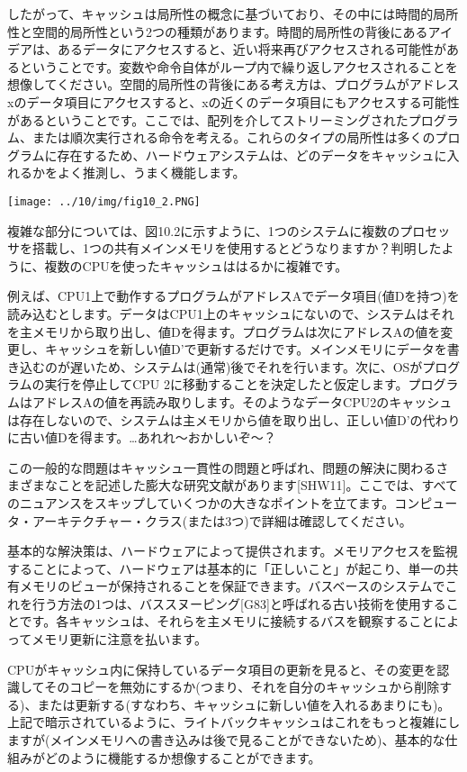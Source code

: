 したがって、キャッシュは局所性の概念に基づいており、その中には時間的局所性と空間的局所性という2つの種類があります。時間的局所性の背後にあるアイデアは、あるデータにアクセスすると、近い将来再びアクセスされる可能性があるということです。変数や命令自体がループ内で繰り返しアクセスされることを想像してください。空間的局所性の背後にある考え方は、プログラムがアドレスxのデータ項目にアクセスすると、xの近くのデータ項目にもアクセスする可能性があるということです。ここでは、配列を介してストリーミングされたプログラム、または順次実行される命令を考える。これらのタイプの局所性は多くのプログラムに存在するため、ハードウェアシステムは、どのデータをキャッシュに入れるかをよく推測し、うまく機能します。

\texttt{[image: ../10/img/fig10\_2.PNG]}

複雑な部分については、図10.2に示すように、1つのシステムに複数のプロセッサを搭載し、1つの共有メインメモリを使用するとどうなりますか？判明したように、複数のCPUを使ったキャッシュははるかに複雑です。

例えば、CPU1上で動作するプログラムがアドレスAでデータ項目(値Dを持つ)を読み込むとします。データはCPU1上のキャッシュにないので、システムはそれを主メモリから取り出し、値Dを得ます。プログラムは次にアドレスAの値を変更し、キャッシュを新しい値D'で更新するだけです。メインメモリにデータを書き込むのが遅いため、システムは(通常)後でそれを行います。次に、OSがプログラムの実行を停止してCPU
2に移動することを決定したと仮定します。プログラムはアドレスAの値を再読み取りします。そのようなデータCPU2のキャッシュは存在しないので、システムは主メモリから値を取り出し、正しい値D'の代わりに古い値Dを得ます。\ldots あれれ～おかしいぞ～？

この一般的な問題はキャッシュ一貫性の問題と呼ばれ、問題の解決に関わるさまざまなことを記述した膨大な研究文献があります{[}SHW11{]}。ここでは、すべてのニュアンスをスキップしていくつかの大きなポイントを立てます。コンピュータ・アーキテクチャー・クラス(または3つ)で詳細は確認してください。

基本的な解決策は、ハードウェアによって提供されます。メモリアクセスを監視することによって、ハードウェアは基本的に「正しいこと」が起こり、単一の共有メモリのビューが保持されることを保証できます。バスベースのシステムでこれを行う方法の1つは、バススヌーピング{[}G83{]}と呼ばれる古い技術を使用することです。各キャッシュは、それらを主メモリに接続するバスを観察することによってメモリ更新に注意を払います。

CPUがキャッシュ内に保持しているデータ項目の更新を見ると、その変更を認識してそのコピーを無効にするか(つまり、それを自分のキャッシュから削除する)、または更新する(すなわち、キャッシュに新しい値を入れるあまりにも)。上記で暗示されているように、ライトバックキャッシュはこれをもっと複雑にしますが(メインメモリへの書き込みは後で見ることができないため)、基本的な仕組みがどのように機能するか想像することができます。

